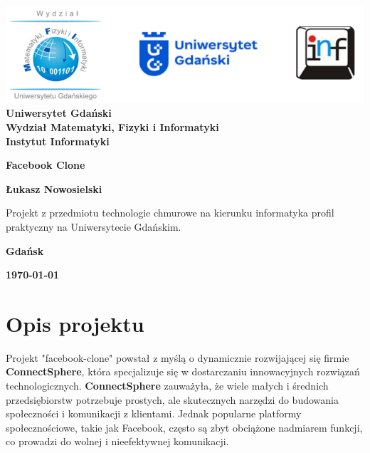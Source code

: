 \documentclass[12pt,a4paper]{article}
\newcommand{\hmwkTitle}{Facebook Clone} %
\newcommand{\hmwkDueDate}{\today} %
\newcommand{\hmwkAuthorName}{Łukasz Nowosielski} %
\begin{document}
\begin{titlepage}
    \vfill
	\begin{center}
	\hspace*{-1cm}
	\vspace*{0.5cm}
    \includegraphics[scale=0.55]{imagens/loga.png}\\
	\textbf{Uniwersytet Gdański \\ [0.05cm]Wydział Matematyki, Fizyki i Informatyki \\ [0.05cm] Instytut Informatyki}

	\vspace{0.6cm}
	\vspace{4cm}
	{\huge \textbf{\hmwkTitle}}\vspace{8mm}
	
	{\large \textbf{\hmwkAuthorName}}\\[3cm]
	
		\hspace{.45\textwidth} %
	   \begin{minipage}{.5\textwidth}
	   Projekt z przedmiotu technologie chmurowe na kierunku informatyka profil praktyczny na Uniwersytecie Gdańskim.\\[0.1cm]
	  \end{minipage}
	  \vfill
	
	\textbf{Gdańsk}
	
	\textbf{\hmwkDueDate}
	\end{center}
	
\end{titlepage}

\newpage
\setcounter{secnumdepth}{5}
\tableofcontents
\newpage

\section{Opis projektu}
\label{sec:Project}

Projekt "facebook-clone" powstał z myślą o dynamicznie rozwijającej się firmie \textbf{ConnectSphere}, która specjalizuje się w dostarczaniu innowacyjnych rozwiązań technologicznych. \textbf{ConnectSphere} zauważyła, że wiele małych i średnich przedsiębiorstw potrzebuje prostych, ale skutecznych narzędzi do budowania społeczności i komunikacji z klientami. Jednak popularne platformy społecznościowe, takie jak Facebook, często są zbyt obciążone nadmiarem funkcji, co prowadzi do wolnej i nieefektywnej komunikacji.
\end{document}
